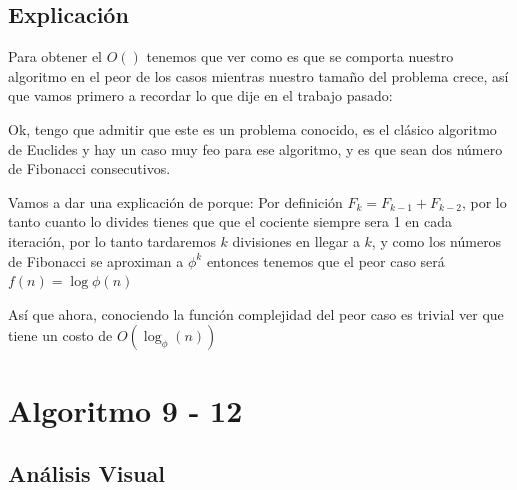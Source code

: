 \documentclass[12pt, fleqn]{article}                            %
\theoremstyle{break}                                            %
\begin{document}
    \vspace{1em}
    \subsection{Explicación}

        Para obtener el $O()$ tenemos que ver como es que se comporta nuestro algoritmo
        en el peor de los casos mientras nuestro tamaño del problema crece, así que vamos
        primero a recordar lo que dije en el trabajo pasado:

        Ok, tengo que admitir que este es un problema conocido, es el clásico algoritmo de Euclides
        y hay un caso muy feo para ese algoritmo, y es que sean dos número de Fibonacci consecutivos.

        Vamos a dar una explicación de porque:
        Por definición $F_{k} = F_{k -1} + F_{k - 2}$, por lo tanto cuanto lo divides tienes que 
        que el cociente siempre sera 1 en cada iteración, por lo tanto tardaremos $k$ divisiones en 
        llegar a $k$, y como los números de Fibonacci se aproximan a $\phi^k$ entonces
        tenemos que el peor caso será $f(n) = \log{\phi}(n)$

        Así que ahora, conociendo la función complejidad del peor caso es trivial ver que tiene
        un costo de $O(\log_{\phi}(n))$


\clearpage
\section{Algoritmo 9 - 12}


    \subsection{Análisis Visual}
\end{document}
